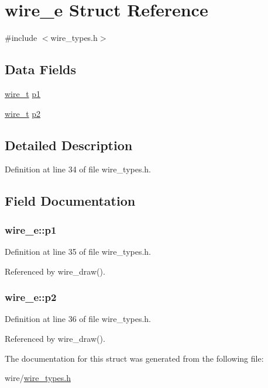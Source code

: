 \hypertarget{structwire__e}{\section{wire\-\_\-e Struct Reference}
\label{structwire__e}
}


{\ttfamily \#include $<$wire\-\_\-types.\-h$>$}

\subsection*{Data Fields}
\begin{DoxyCompactItemize}
\item 
\hyperlink{wire__types_8h_ace84d5e6e326f6a52d978bd9900baee6}{wire\-\_\-t} \hyperlink{structwire__e_a00cfec6074c9bfb7f674fed20174abad}{p1}
\item 
\hyperlink{wire__types_8h_ace84d5e6e326f6a52d978bd9900baee6}{wire\-\_\-t} \hyperlink{structwire__e_a2167b2f5bbd853ae35f7bb53a1a2685d}{p2}
\end{DoxyCompactItemize}


\subsection{Detailed Description}


Definition at line 34 of file wire\-\_\-types.\-h.



\subsection{Field Documentation}
\hypertarget{structwire__e_a00cfec6074c9bfb7f674fed20174abad}{
\subsubsection[{p1}]{ wire\-\_\-e\-::p1}}\label{structwire__e_a00cfec6074c9bfb7f674fed20174abad}


Definition at line 35 of file wire\-\_\-types.\-h.



Referenced by wire\-\_\-draw().

\hypertarget{structwire__e_a2167b2f5bbd853ae35f7bb53a1a2685d}{
\subsubsection[{p2}]{ wire\-\_\-e\-::p2}}\label{structwire__e_a2167b2f5bbd853ae35f7bb53a1a2685d}


Definition at line 36 of file wire\-\_\-types.\-h.



Referenced by wire\-\_\-draw().



The documentation for this struct was generated from the following file\-:\begin{DoxyCompactItemize}
\item 
wire/\hyperlink{wire__types_8h}{wire\-\_\-types.\-h}\end{DoxyCompactItemize}
